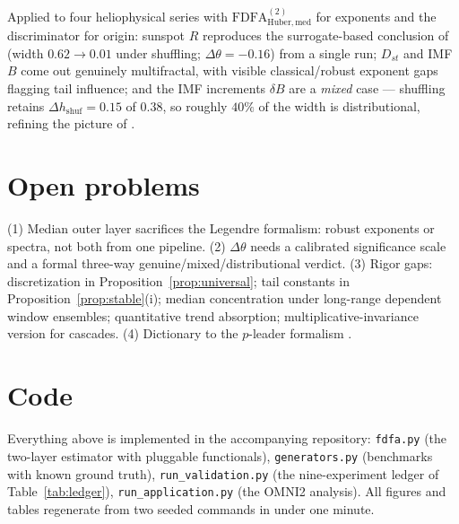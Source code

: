\documentclass[10pt, letterpaper]{paper}
\theoremstyle{remark}
\begin{document}
Applied to four heliophysical series with
$\mathrm{FDFA}^{(2)}_{\mathrm{Huber},\mathrm{med}}$ for exponents
and the discriminator for origin: sunspot $R$ reproduces the
surrogate-based conclusion of \citet{movahed2006} (width $0.62\to
0.01$ under shuffling; $\Delta\theta=-0.16$) from a single run;
$D_{st}$ and IMF $B$ come out genuinely multifractal, with visible
classical/robust exponent gaps flagging tail influence; and the IMF
increments $\delta B$ are a \emph{mixed} case --- shuffling retains
$\Delta h_{\mathrm{shuf}}=0.15$ of $0.38$, so roughly $40\%$ of the
width is distributional, refining the picture of
\citet{macek2011}.

\section{Open problems}

(1) Median outer layer sacrifices the Legendre formalism: robust
exponents or spectra, not both from one pipeline. (2)
$\Delta\theta$ needs a calibrated significance scale and a formal
three-way genuine/mixed/distributional verdict. (3) Rigor gaps:
discretization in Proposition~\ref{prop:universal}; tail constants
in Proposition~\ref{prop:stable}(i); median concentration under
long-range dependent window ensembles; quantitative trend
absorption; multiplicative-invariance version for cascades. (4)
Dictionary to the $p$-leader formalism \citep{leonarduzzi2016}.

\section*{Code}

Everything above is implemented in the accompanying repository:
\texttt{fdfa.py} (the two-layer estimator with pluggable
functionals), \texttt{generators.py} (benchmarks with known ground
truth), \texttt{run\_validation.py} (the nine-experiment ledger of
Table~\ref{tab:ledger}), \texttt{run\_application.py} (the OMNI2
analysis). All figures and tables regenerate from two seeded
commands in under one minute.



\end{document}
